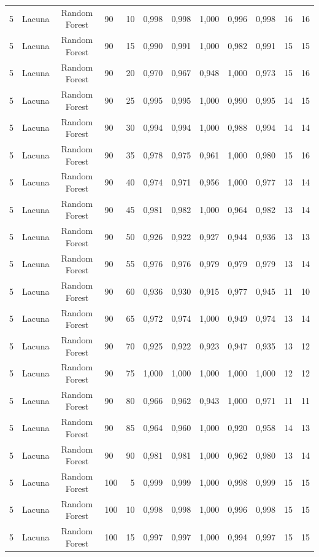 \begin{longtable}{ccclrrrrrrrr}
5 & Lacuna & Random Forest & 90 & 10 & 0,998 & 0,998 & 1,000 & 0,996 & 0,998 & 16 & 16 \\
5 & Lacuna & Random Forest & 90 & 15 & 0,990 & 0,991 & 1,000 & 0,982 & 0,991 & 15 & 15 \\
5 & Lacuna & Random Forest & 90 & 20 & 0,970 & 0,967 & 0,948 & 1,000 & 0,973 & 15 & 16 \\
5 & Lacuna & Random Forest & 90 & 25 & 0,995 & 0,995 & 1,000 & 0,990 & 0,995 & 14 & 15 \\
5 & Lacuna & Random Forest & 90 & 30 & 0,994 & 0,994 & 1,000 & 0,988 & 0,994 & 14 & 14 \\
5 & Lacuna & Random Forest & 90 & 35 & 0,978 & 0,975 & 0,961 & 1,000 & 0,980 & 15 & 16 \\
5 & Lacuna & Random Forest & 90 & 40 & 0,974 & 0,971 & 0,956 & 1,000 & 0,977 & 13 & 14 \\
5 & Lacuna & Random Forest & 90 & 45 & 0,981 & 0,982 & 1,000 & 0,964 & 0,982 & 13 & 14 \\
5 & Lacuna & Random Forest & 90 & 50 & 0,926 & 0,922 & 0,927 & 0,944 & 0,936 & 13 & 13 \\
5 & Lacuna & Random Forest & 90 & 55 & 0,976 & 0,976 & 0,979 & 0,979 & 0,979 & 13 & 14 \\
5 & Lacuna & Random Forest & 90 & 60 & 0,936 & 0,930 & 0,915 & 0,977 & 0,945 & 11 & 10 \\
5 & Lacuna & Random Forest & 90 & 65 & 0,972 & 0,974 & 1,000 & 0,949 & 0,974 & 13 & 14 \\
5 & Lacuna & Random Forest & 90 & 70 & 0,925 & 0,922 & 0,923 & 0,947 & 0,935 & 13 & 12 \\
5 & Lacuna & Random Forest & 90 & 75 & 1,000 & 1,000 & 1,000 & 1,000 & 1,000 & 12 & 12 \\
5 & Lacuna & Random Forest & 90 & 80 & 0,966 & 0,962 & 0,943 & 1,000 & 0,971 & 11 & 11 \\
5 & Lacuna & Random Forest & 90 & 85 & 0,964 & 0,960 & 1,000 & 0,920 & 0,958 & 14 & 13 \\
5 & Lacuna & Random Forest & 90 & 90 & 0,981 & 0,981 & 1,000 & 0,962 & 0,980 & 13 & 14 \\
5 & Lacuna & Random Forest & 100 & 5 & 0,999 & 0,999 & 1,000 & 0,998 & 0,999 & 15 & 15 \\
5 & Lacuna & Random Forest & 100 & 10 & 0,998 & 0,998 & 1,000 & 0,996 & 0,998 & 15 & 15 \\
5 & Lacuna & Random Forest & 100 & 15 & 0,997 & 0,997 & 1,000 & 0,994 & 0,997 & 15 & 15 \\

\end{longtable}
